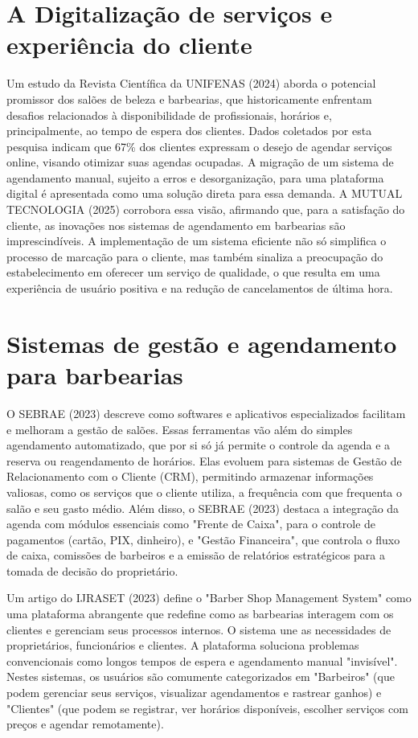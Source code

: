 \documentclass[
    12pt, 
    a4paper, 
    oneside, 
    chapter=TITLE, 
    section=TITLE
]{abntex2}
\begin{document}
\section{A Digitalização de serviços e experiência do cliente}
Um estudo da Revista Científica da UNIFENAS (2024) aborda o potencial promissor dos salões de beleza e barbearias, que historicamente enfrentam desafios relacionados à disponibilidade de profissionais, horários e, principalmente, ao tempo de espera dos clientes. Dados coletados por esta pesquisa indicam que 67\% dos clientes expressam o desejo de agendar serviços online, visando otimizar suas agendas ocupadas. A migração de um sistema de agendamento manual, sujeito a erros e desorganização, para uma plataforma digital é apresentada como uma solução direta para essa demanda. A MUTUAL TECNOLOGIA (2025) corrobora essa visão, afirmando que, para a satisfação do cliente, as inovações nos sistemas de agendamento em barbearias são imprescindíveis. A implementação de um sistema eficiente não só simplifica o processo de marcação para o cliente, mas também sinaliza a preocupação do estabelecimento em oferecer um serviço de qualidade, o que resulta em uma experiência de usuário positiva e na redução de cancelamentos de última hora.

\section{Sistemas de gestão e agendamento para barbearias}
O SEBRAE (2023) descreve como softwares e aplicativos especializados facilitam e melhoram a gestão de salões. Essas ferramentas vão além do simples agendamento automatizado, que por si só já permite o controle da agenda e a reserva ou reagendamento de horários. Elas evoluem para sistemas de Gestão de Relacionamento com o Cliente (CRM), permitindo armazenar informações valiosas, como os serviços que o cliente utiliza, a frequência com que frequenta o salão e seu gasto médio. Além disso, o SEBRAE (2023) destaca a integração da agenda com módulos essenciais como "Frente de Caixa", para o controle de pagamentos (cartão, PIX, dinheiro), e "Gestão Financeira", que controla o fluxo de caixa, comissões de barbeiros e a emissão de relatórios estratégicos para a tomada de decisão do proprietário.

Um artigo do IJRASET (2023) define o "Barber Shop Management System" como uma plataforma abrangente que redefine como as barbearias interagem com os clientes e gerenciam seus processos internos. O sistema une as necessidades de proprietários, funcionários e clientes. A plataforma soluciona problemas convencionais como longos tempos de espera e agendamento manual "invisível". Nestes sistemas, os usuários são comumente categorizados em "Barbeiros" (que podem gerenciar seus serviços, visualizar agendamentos e rastrear ganhos) e "Clientes" (que podem se registrar, ver horários disponíveis, escolher serviços com preços e agendar remotamente).
\end{document}
